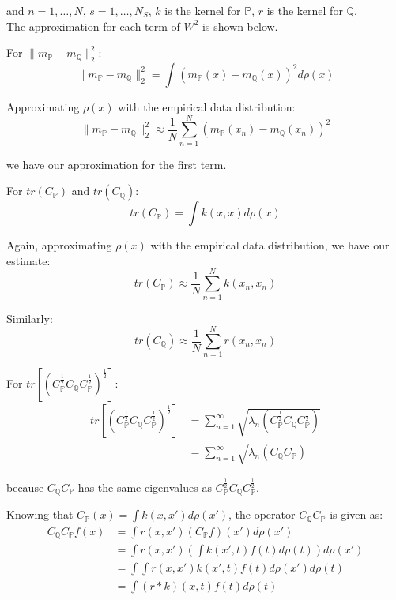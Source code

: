 \documentclass[twoside,11pt]{article}
\begin{document}
and $n=1,\dots, N$, $s=1, \dots, N_S$, $k$ is the kernel for $\mathbb{P}$, $r$ is the kernel for $\mathbb{Q}$. \\

The approximation for each term of $W^2$ is shown below.

For $\|m_{\mathbb{P}} - m_{\mathbb{Q}}\|_2^2$:
\[\|m_{\mathbb{P}} - m_{\mathbb{Q}}\|_2^2 = \int \left(m_{\mathbb{P}}(x) - m_{\mathbb{Q}}(x)\right)^2 d\rho(x)\]

Approximating $\rho(x)$ with the empirical data distribution:
\[\|m_{\mathbb{P}} - m_{\mathbb{Q}}\|_2^2 \approx \frac{1}{N}\sum_{n=1}^N (m_{\mathbb{P}}(x_n)-m_{\mathbb{Q}}(x_n))^2\]

we have our approximation for the first term.

For $tr(C_{\mathbb{P}})$ and  $tr(C_{\mathbb{Q}})$:
\[tr(C_{\mathbb{P}}) = \int k(x, x) d\rho(x)\]

Again, approximating $\rho(x)$ with the empirical data distribution, we have our estimate:
\[tr(C_{\mathbb{P}}) \approx \frac{1}{N}\sum_{n=1}^{N}k(x_n, x_n)\]

Similarly:
\[tr(C_{\mathbb{Q}})  \approx \frac{1}{N}\sum_{n=1}^{N}r(x_n, x_n)\]

For $tr \left[ \left( C_{\mathbb{P}}^{\frac{1}{2}}C_{\mathbb{Q}}C_{\mathbb{P}}^{\frac{1}{2}}\right)^{\frac{1}{2}}\right]$:
\begin{align*}
tr \left[ \left( C_{\mathbb{P}}^{\frac{1}{2}}C_{\mathbb{Q}}C_{\mathbb{P}}^{\frac{1}{2}}\right)^{\frac{1}{2}}\right] &= \sum_{n=1}^{\infty} \sqrt {\lambda_n\left( C_{\mathbb{P}}^{\frac{1}{2}}C_{\mathbb{Q}}C_{\mathbb{P}}^{\frac{1}{2}}\right)}\\
&= \sum_{n=1}^{\infty} \sqrt {\lambda_n\left( C_{\mathbb{Q}}C_{\mathbb{P}}\right)}
\end{align*}

because $C_{\mathbb{Q}}C_{\mathbb{P}}$ has the same eigenvalues as $C_{\mathbb{P}}^{\frac{1}{2}}C_{\mathbb{Q}}C_{\mathbb{P}}^{\frac{1}{2}}$.

Knowing that $C_{\mathbb{P}}(x) = \int k(x, x') d\rho(x')$, the operator $C_{\mathbb{Q}}C_{\mathbb{P}}$  is given as:
\begin{align*}
C_{\mathbb{Q}}C_{\mathbb{P}}f(x) &= \int r(x, x')\left(C_{\mathbb{P}} f \right) (x') d\rho(x')\\
&= \int r(x, x')\left( \int k(x', t)f(t) d\rho(t) \right) d\rho(x')\\
&= \int \int r(x, x')  k(x', t)f(t) d\rho(x') d\rho(t)\\
&= \int (r * k)(x, t)  f(t) d\rho(t)\\
\end{align*}
\end{document}
